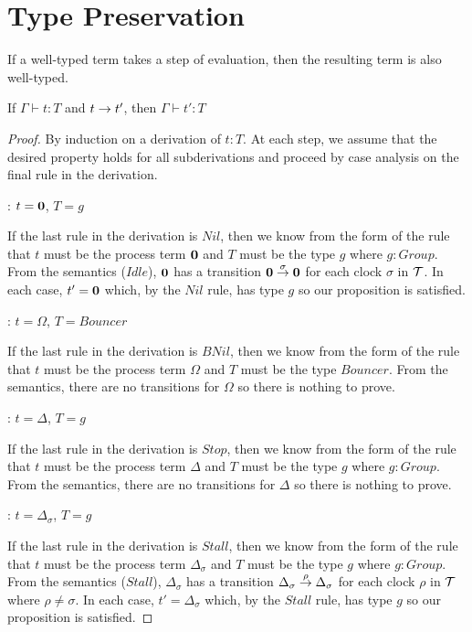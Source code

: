 \chapter{Type Preservation}

If a well-typed term takes a step of evaluation, then the resulting term is also well-typed.

\begin{proposition}
If $\Gamma \vdash t : T$ and $t \stackrel{}{\rightarrow} t'$, then $\Gamma \vdash t' : T$
\end{proposition}

\begin{proof}
By induction on a derivation of $t:T$.  At each step, we assume that
the desired property holds for all subderivations and proceed by case
analysis on the final rule in the derivation.

: $t = \textbf{0}$, $T = g$

\noindent If the last rule in the derivation is $Nil$, then we know
from the form of the rule that $t$ must be the process term $\textbf{0}$ and
$T$ must be the type $g$ where $g : Group$.  From the semantics
($Idle$), $\textbf{0}$ has a transition $\textbf{0} \stackrel{\sigma}{\rightarrow} \textbf{0}$ for
each clock $\sigma$ in $\text{$\mathcal{T}$}$.  In each case, $t' = \textbf{0}$ which, by
the $Nil$ rule, has type $g$ so our proposition is satisfied.

: $t = \Omega$, $T = Bouncer$

\noindent If the last rule in the derivation is $BNil$, then we know
from the form of the rule that $t$ must be the process term $\Omega$
and $T$ must be the type $Bouncer$.  From the semantics, there are no
transitions for $\Omega$ so there is nothing to prove.

: $t = \Delta$, $T = g$

\noindent If the last rule in the derivation is $Stop$, then we know
from the form of the rule that $t$ must be the process term $\Delta$
and $T$ must be the type $g$ where $g : Group$.  From the semantics,
there are no transitions for $\Delta$ so there is nothing to prove.

: $t = \Delta_\sigma$, $T = g$

\noindent If the last rule in the derivation is $Stall$, then we know
from the form of the rule that $t$ must be the process term
$\Delta_\sigma$ and $T$ must be the type $g$ where $g : Group$.  From
the semantics ($Stall$), $\Delta_\sigma$ has a transition
$\Delta_\sigma \stackrel{\rho}{\rightarrow} \Delta_\sigma$ for each clock $\rho$ in
$\text{$\mathcal{T}$}$ where $\rho \ne \sigma$.  In each case, $t' = \Delta_\sigma$
which, by the $Stall$ rule, has type $g$ so our proposition is
satisfied.


\end{proof}
